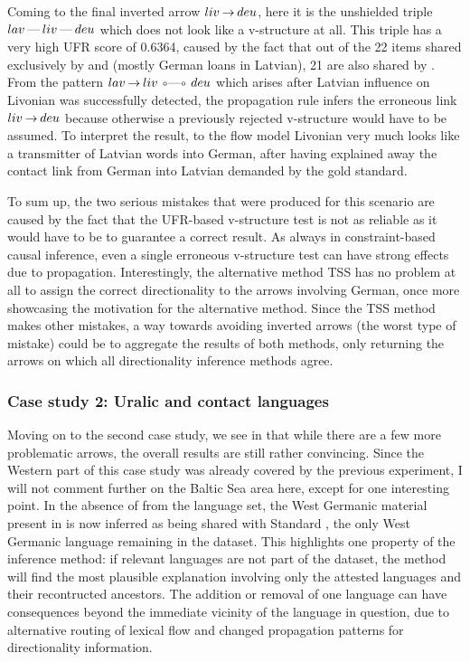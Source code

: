  Coming to the final inverted arrow $liv \arrowLA deu$, here it is the unshielded triple $lav \arrowLL liv \arrowLL deu$ which does not look like a v-structure at all. This triple has a very high UFR score of 0.6364, caused by the fact that out of the 22 items shared exclusively by  and  (mostly German loans in Latvian), 21 are also shared by . From the pattern $lav \arrowLA liv \arrowOO deu$ which arises after Latvian influence on Livonian was successfully detected, the propagation rule infers the erroneous link $liv \arrowLA deu$ because otherwise a previously rejected v-structure would have to be assumed. To interpret the result, to the flow model Livonian very much looks like a transmitter of Latvian words into German, after having explained away the contact link from German into Latvian demanded by the gold standard.
 
 To sum up, the two serious mistakes that were produced for this scenario are caused by the fact that the UFR-based v-structure test is not as reliable as it would have to be to guarantee a correct result. As always in constraint-based causal inference, even a single erroneous v-structure test can have strong effects due to propagation. Interestingly, the alternative method TSS has no problem at all to assign the correct directionality to the arrows involving German, once more showcasing the motivation for the alternative method. Since the TSS method makes other mistakes, a way towards avoiding inverted arrows (the worst type of mistake) could be to aggregate the results of both methods, only returning the arrows on which all directionality inference methods agree.
 
 \subsubsection{Case study 2: Uralic and contact languages}
 Moving on to the second case study, we see in  that while there are a few more problematic arrows, the overall results are still rather convincing. Since the Western part of this case study was already covered by the previous experiment, I will not comment further on the Baltic Sea area here, except for one interesting point. In the absence of  from the language set, the West Germanic material present in  is now inferred as being shared with Standard , the only West Germanic language remaining in the dataset. This highlights one property of the inference method: if relevant languages are not part of the dataset, the method will find the most plausible explanation involving only the attested languages and their recontructed ancestors. The addition or removal of one language can have consequences beyond the immediate vicinity of the language in question, due to alternative routing of lexical flow and changed propagation patterns for directionality information.
 
